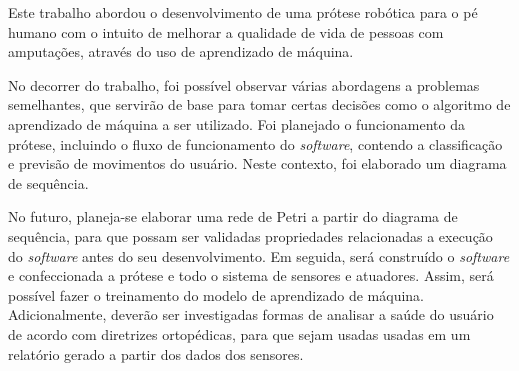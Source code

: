 Este trabalho abordou o desenvolvimento de uma prótese robótica para o pé humano com o intuito de melhorar a qualidade de vida de pessoas com amputações, através do uso de aprendizado de máquina.

No decorrer do trabalho, foi possível observar várias abordagens a problemas semelhantes, que servirão de base para tomar certas decisões como o algoritmo de aprendizado de máquina a ser utilizado.
% 
Foi planejado o funcionamento da prótese, incluindo o fluxo de funcionamento do \textit{software}, contendo a classificação e previsão de movimentos do usuário. Neste contexto, foi elaborado um diagrama de sequência.

No futuro, planeja-se elaborar uma rede de Petri a partir do diagrama de sequência, para que possam ser validadas propriedades relacionadas a execução do \textit{software} antes do seu desenvolvimento. Em seguida, será construído o \textit{software} e confeccionada a prótese e todo o sistema de sensores e atuadores. Assim, será possível fazer o treinamento do modelo de aprendizado de máquina.
% 
Adicionalmente, deverão ser investigadas formas de analisar a saúde do usuário de acordo com diretrizes ortopédicas, para que sejam usadas usadas em um relatório gerado a partir dos dados dos sensores.